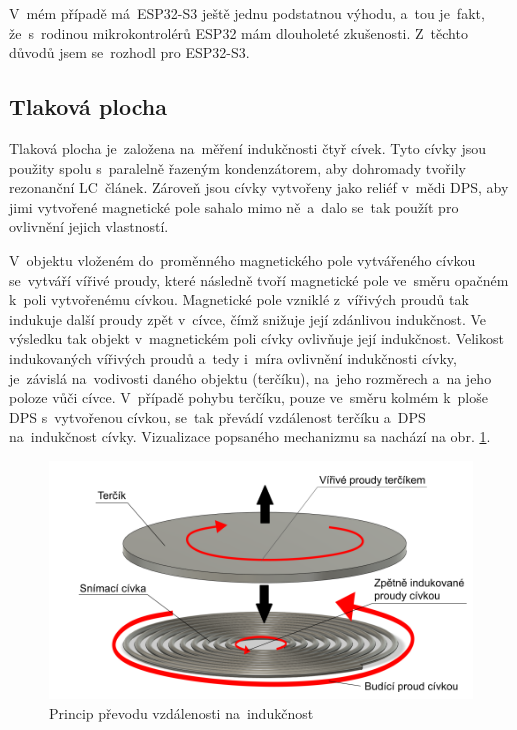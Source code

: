V~mém případě má~ESP32-S3 ještě jednu podstatnou výhodu, a~tou je~fakt, že~s~rodinou mikrokontrolérů ESP32 mám dlouholeté zkušenosti.
Z~těchto důvodů jsem se~rozhodl pro ESP32-S3.

\subsection{Tlaková plocha \label{popisTlakovky2}}
Tlaková plocha je~založena na~měření indukčnosti čtyř cívek.
Tyto cívky jsou použity spolu s~paralelně řazeným kondenzátorem, aby dohromady tvořily rezonanční LC~článek.
Zároveň jsou cívky vytvořeny jako reliéf v~mědi DPS, aby jimi vytvořené magnetické pole sahalo mimo ně~a~dalo se~tak použít pro ovlivnění jejich vlastností.

V~objektu vloženém do~proměnného magnetického pole vytvářeného cívkou se~vytváří vířivé proudy, které následně tvoří magnetické pole ve~směru opačném k~poli vytvořenému cívkou.
Magnetické pole vzniklé z~vířivých proudů tak indukuje další proudy zpět v~cívce, čímž snižuje její zdánlivou indukčnost.
Ve výsledku tak objekt v~magnetickém poli cívky ovlivňuje její indukčnost.
Velikost indukovaných vířivých proudů a~tedy i~míra ovlivnění indukčnosti cívky, je~závislá na~vodivosti daného objektu (terčíku), na~jeho rozměrech a~na jeho poloze vůči cívce.
V~případě pohybu terčíku, pouze ve~směru kolmém k~ploše DPS s~vytvořenou cívkou, se~tak převádí vzdálenost terčíku a~DPS na~indukčnost cívky.
Vizualizace popsaného mechanizmu sa nachází na obr. \ref{fig:pryncip-LDC}.

\begin{figure}[h!]
    \centering
    \includegraphics[width=\textwidth]{text/PraktickaCast/img/civka_tercik_ilustrace.png}
    \caption{Princip převodu vzdálenosti na~indukčnost}
    \label{fig:pryncip-LDC}
\end{figure}


